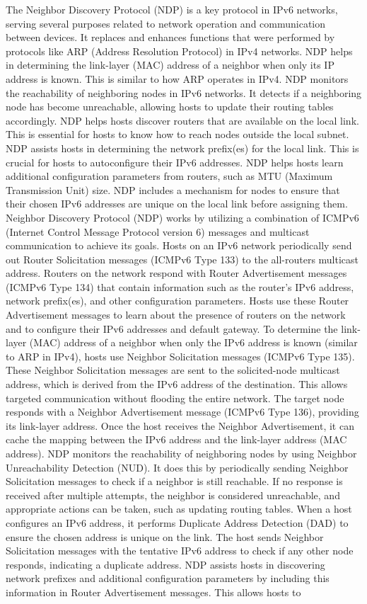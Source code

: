 \documentclass{article}
\begin{document}
The Neighbor Discovery Protocol (NDP) is a key protocol in IPv6 networks, serving several purposes related to network operation and communication between devices. It replaces and enhances functions that were performed by protocols like ARP (Address Resolution Protocol) in IPv4 networks. NDP helps in determining the link-layer (MAC) address of a neighbor when only its IP address is known. This is similar to how ARP operates in IPv4. NDP monitors the reachability of neighboring nodes in IPv6 networks. It detects if a neighboring node has become unreachable, allowing hosts to update their routing tables accordingly. NDP helps hosts discover routers that are available on the local link. This is essential for hosts to know how to reach nodes outside the local subnet. NDP assists hosts in determining the network prefix(es) for the local link. This is crucial for hosts to autoconfigure their IPv6 addresses. NDP helps hosts learn additional configuration parameters from routers, such as MTU (Maximum Transmission Unit) size. NDP includes a mechanism for nodes to ensure that their chosen IPv6 addresses are unique on the local link before assigning them. Neighbor Discovery Protocol (NDP) works by utilizing a combination of ICMPv6 (Internet Control Message Protocol version 6) messages and multicast communication to achieve its goals. Hosts on an IPv6 network periodically send out Router Solicitation messages (ICMPv6 Type 133) to the all-routers multicast address. Routers on the network respond with Router Advertisement messages (ICMPv6 Type 134) that contain information such as the router’s IPv6 address, network prefix(es), and other configuration parameters. Hosts use these Router Advertisement messages to learn about the presence of routers on the network and to configure their IPv6 addresses and default gateway. To determine the link-layer (MAC) address of a neighbor when only the IPv6 address is known (similar to ARP in IPv4), hosts use Neighbor Solicitation messages (ICMPv6 Type 135). These Neighbor Solicitation messages are sent to the solicited-node multicast address, which is derived from the IPv6 address of the destination. This allows targeted communication without flooding the entire network. The target node responds with a Neighbor Advertisement message (ICMPv6 Type 136), providing its link-layer address. Once the host receives the Neighbor Advertisement, it can cache the mapping between the IPv6 address and the link-layer address (MAC address). NDP monitors the reachability of neighboring nodes by using Neighbor Unreachability Detection (NUD). It does this by periodically sending Neighbor Solicitation messages to check if a neighbor is still reachable. If no response is received after multiple attempts, the neighbor is considered unreachable, and appropriate actions can be taken, such as updating routing tables. When a host configures an IPv6 address, it performs Duplicate Address Detection (DAD) to ensure the chosen address is unique on the link. The host sends Neighbor Solicitation messages with the tentative IPv6 address to check if any other node responds, indicating a duplicate address. NDP assists hosts in discovering network prefixes and additional configuration parameters by including this information in Router Advertisement messages. This allows hosts to 
\end{document}
